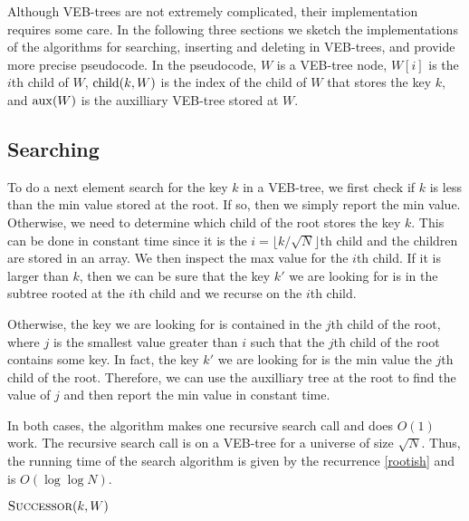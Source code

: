 Although VEB-trees are not extremely complicated, their implementation
requires some care.  In the following three sections we sketch the
implementations of the algorithms for searching, inserting and
deleting in VEB-trees, and provide more precise pseudocode.  In the
pseudocode, $W$ is a VEB-tree node, $W[i]$ is the $i$th child of $W$,
$\mathrm{child}(k,W)$ is the index of the child of $W$ that stores the key
$k$, and $\mathrm{aux}(W)$ is the auxilliary VEB-tree stored at $W$.


\subsection{Searching}

To do a next element search for the key $k$ in a VEB-tree, we first
check if $k$ is less than the min value stored at the root.  If so,
then we simply report the min value.  Otherwise, we need to determine
which child of the root stores the key $k$.  This can be done in
constant time since it is the $i=\lfloor k/\sqrt{N}\rfloor$th child
and the children are stored in an array.  We then inspect the max
value for the $i$th child.  If it is larger than $k$, then we can be
sure that the key $k'$ we are looking for is in the subtree rooted at
the $i$th child and we recurse on the $i$th child.

Otherwise, the key we are looking for is contained in the $j$th child
of the root, where $j$ is the smallest value greater than $i$ such
that the $j$th child of the root contains some key.  In fact, the key
$k'$ we are looking for is the min value the $j$th child of the root.
Therefore, we can use the auxilliary tree at the root to find the
value of $j$ and then report the min value in constant time.

In both cases, the algorithm makes one recursive search call and does
$O(1)$ work.  The recursive search call is on a VEB-tree for a
universe of size $\sqrt{N}$.  Thus, the running time of the search
algorithm is given by the recurrence \eqref{rootish} and is
$O(\log\log N)$.

\noindent$\textsc{Successor}(k,W)$
\begin{algorithmic}[1]
\ENDIF
{}
   
\ELSE
    
\ENDIF
\end{algorithmic}

